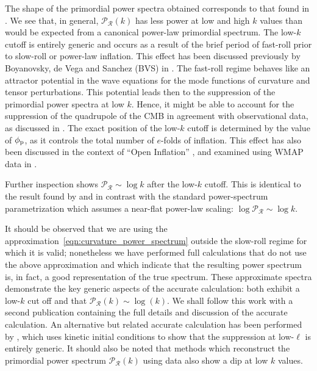 The shape of the primordial power spectra obtained corresponds to that found in \citep{lasenby_closed_2003}. We see that, in general, \(\mathcal{P}_\mathcal{R}(k)\) has less power at low and high \(k\) values than would be expected from a canonical power-law primordial spectrum.  The low-\(k\) cutoff is entirely generic and occurs as a result of the brief period of fast-roll prior to slow-roll or power-law inflation.  This effect has been discussed previously by Boyanovsky, de Vega and Sanchez (BVS) in \citep{boyanovsky_cmb_2006}. The fast-roll regime behaves like an attractor potential in the wave equations for the mode functions of curvature and tensor perturbations. This potential leads then to the suppression of the primordial power spectra at low \(k\).  Hence, it might be able to account for the suppression of the quadrupole of the CMB in agreement with observational data, as discussed in \citep{boyanovsky_cmb_2006-1}.  The exact position of the low-\(k\) cutoff is determined by the value of \(\phi_{\mathrm{p}}\), as it controls the total number of \(e\)-folds of inflation. This effect has also been discussed in the context of ``Open Inflation'' \citep{Yamauchi_strings_2011,Linde_open_1999,Linde_toy_1999}, and examined using WMAP data in \citet{Contaldi_suppress_2003}.

Further inspection shows \(\mathcal{P}_\mathcal{R} \sim \log k\) after the low-\(k\) cutoff. This is identical to the result found by \citet{lasenby_closed_2003} and in contrast with the standard power-spectrum parametrization which assumes a near-flat power-law scaling: \(\log\mathcal{P}_\mathcal{R}\sim \log k\). 

 
It should be observed that we are using the approximation~\eqref{eqn:curvature_power_spectrum} outside the slow-roll regime for which it is valid; nonetheless we have performed full calculations that do not use the above approximation and which indicate that the resulting power spectrum is, in fact, a good representation of the true spectrum. These approximate spectra demonstrate the key generic aspects of the accurate calculation: both exhibit a low-\(k\) cut off and that \(\mathcal{P}_\mathcal{R}(k) \sim \log(k)\).  We shall follow this work with a second publication containing the full details and discussion of the accurate calculation. An alternative but related accurate calculation has been performed by \citep{Lello_tensor_2013}, which uses kinetic initial conditions to show that the suppression at low-\(\ell\) is entirely generic. It should also be noted that methods which reconstruct the primordial power spectrum \(\mathcal{P}_\mathcal{R}(k)\) \citep{vazquez_reconstruction,Hazra_reconstruction_2013} using data also show a dip at low \(k\) values.

